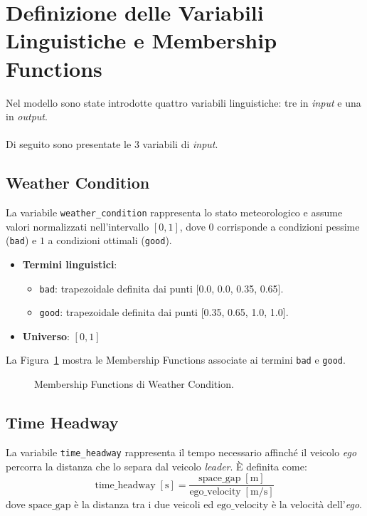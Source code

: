 \section{Definizione delle Variabili Linguistiche e Membership Functions}

Nel modello sono state introdotte quattro variabili linguistiche: tre in \emph{input} e una in \emph{output}.
\\\\
Di seguito sono presentate le 3 variabili di \emph{input}.

\subsection{Weather Condition}
La variabile \texttt{weather\_condition} rappresenta lo stato meteorologico e assume valori normalizzati nell'intervallo \([0,1]\), 
dove \(0\) corrisponde a condizioni pessime (\texttt{bad}) e \(1\) a condizioni ottimali (\texttt{good}).  

\begin{itemize}
  \item \textbf{Termini linguistici}:
    \begin{itemize}
      \item \texttt{bad}: trapezoidale definita dai punti [0.0, 0.0, 0.35, 0.65].
      \item \texttt{good}: trapezoidale definita dai punti  [0.35, 0.65, 1.0, 1.0].
    \end{itemize}
  \item \textbf{Universo}: \([0,1]\)
\end{itemize}

\noindent La Figura~\ref{Fig:mf_weather_condition} mostra le Membership Functions associate ai termini \texttt{bad} e \texttt{good}.

\begin{figure}[H]
    \centering
    \caption{Membership Functions di Weather Condition.}
    \label{Fig:mf_weather_condition}
\end{figure}

\subsection{Time Headway}
La variabile \texttt{time\_headway} rappresenta il tempo necessario affinché il veicolo \emph{ego} 
percorra la distanza che lo separa dal veicolo \emph{leader}. È definita come:
\[
\text{time\_headway} \; [\mathrm{s}]
= \frac{\text{space\_gap}\;[\mathrm{m}]}{\text{ego\_velocity}\;[\mathrm{m}/\mathrm{s}]}
\]
dove \(\text{space\_gap}\) è la distanza tra i due veicoli ed \emph{\(\text{ego\_velocity}\)} è la velocità dell'\emph{ego}. 
